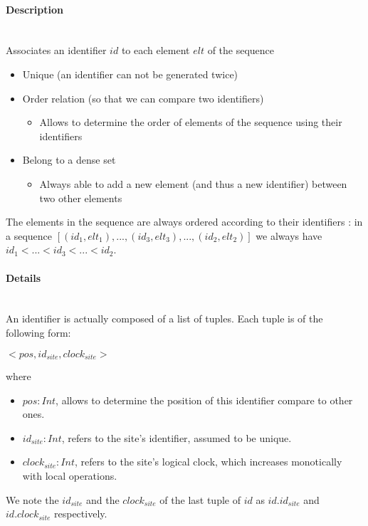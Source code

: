 \documentclass[a4paper]{article}
\begin{document}
\paragraph{Description} ~\\

Associates an identifier $id$ to each element $elt$ of the sequence
\begin{itemize}
  \item Unique (an identifier can not be generated twice)
  \item Order relation (so that we can compare two identifiers)
  \begin{itemize}
    \item Allows to determine the order of elements of the sequence using their identifiers
  \end{itemize}
  \item Belong to a dense set
  \begin{itemize}
    \item Always able to add a new element (and thus a new identifier) between two other elements
  \end{itemize}
\end{itemize}

The elements in the sequence are always ordered according to their identifiers :
in a sequence $[(id_1, elt_1), ..., (id_3, elt_3), ..., (id_2, elt_2)]$
we always have $id_1 < ... < id_3 < ... < id_2$.

\paragraph{Details} ~\\

An identifier is actually composed of a list of tuples. Each tuple is of the following form:
\begin{center}
$<pos, id_{site}, clock_{site}>$
\end{center}
where
\begin{itemize}
  \item $pos: Int$, allows to determine the position of this identifier compare to other ones.
  \item $id_{site}: Int$, refers to the site's identifier, assumed to be unique.
  \item $clock_{site}: Int$, refers to the site's logical clock, which increases monotically with local operations.
\end{itemize}

We note the $id_{site}$ and the $clock_{site}$ of the last tuple of $id$
as $id.id_{site}$ and $id.clock_{site}$ respectively.
\end{document}
